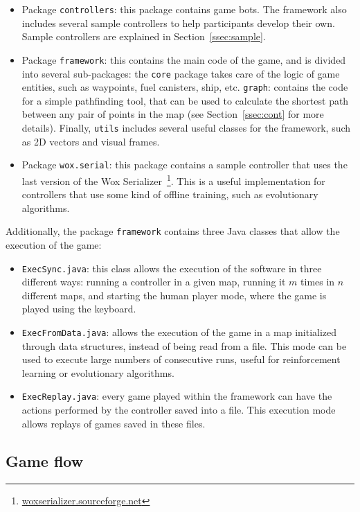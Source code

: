 \documentclass[conference]{IEEEtran}
\newcommand{\code}[1]{{\lstinline!#1!}}
\begin{document}
\begin{itemize}
\item Package \code{controllers}: this package contains game bots. The framework also includes several sample controllers to help participants develop their own. Sample controllers are explained in Section~\ref{ssec:sample}.
\item Package \code{framework}: this contains the main code of the game, and is divided into several sub-packages: the \code{core} package takes care of the logic of game entities, such as waypoints, fuel canisters, ship, etc. \code{graph}: contains the code for a simple pathfinding tool, that can be used to calculate the shortest path between any pair of points in the map (see Section~\ref{ssec:cont} for more details). Finally, \code{utils} includes several useful classes for the framework, such as 2D vectors and visual frames.
\item Package \code{wox.serial}: this package contains a sample controller that uses the last version of the Wox Serializer~\footnote{\url{woxserializer.sourceforge.net}}. This is a useful implementation for controllers that use some kind of offline training, such as evolutionary algorithms.
\end{itemize}

Additionally, the package \code{framework} contains three Java classes that allow the execution of the game:

\begin{itemize}
\item \code{ExecSync.java}: this class allows the execution of the software in three different ways: running a controller in a given map, running it $m$ times in $n$ different maps, and starting the human player mode, where the game is played using the keyboard.
\item \code{ExecFromData.java}: allows the execution of the game in a map initialized through data structures, instead of being read from a file. This mode can be used to execute large numbers of consecutive runs, useful for reinforcement learning or evolutionary algorithms.
\item \code{ExecReplay.java}: every game played within the framework can have the actions performed by the controller saved into a file. This execution mode allows replays of games saved in these files.
\end{itemize}

\subsection{Game flow}
\end{document}

